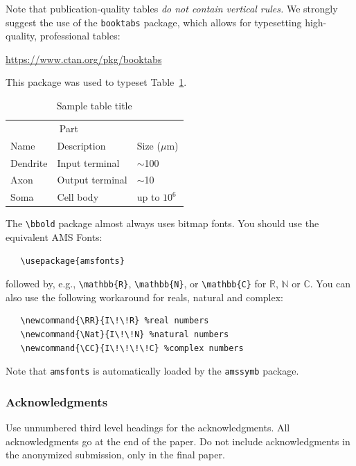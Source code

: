\documentclass{article}
\begin{document}
Note that publication-quality tables \emph{do not contain vertical
  rules.} We strongly suggest the use of the \verb+booktabs+ package,
which allows for typesetting high-quality, professional tables:
\begin{center}
  \url{https://www.ctan.org/pkg/booktabs}
\end{center}
This package was used to typeset Table~\ref{sample-table}.

\begin{table}
  \caption{Sample table title}
  \label{sample-table}
  \centering
  \begin{tabular}{lll}
    \toprule
    \multicolumn{2}{c}{Part}                   \\
    \cmidrule(r){1-2}
    Name     & Description     & Size ($\mu$m) \\
    \midrule
    Dendrite & Input terminal  & $\sim$100     \\
    Axon     & Output terminal & $\sim$10      \\
    Soma     & Cell body       & up to $10^6$  \\
    \bottomrule
  \end{tabular}
\end{table}

The \verb+\bbold+ package almost always uses bitmap fonts.  You
  should use the equivalent AMS Fonts:
\begin{verbatim}
   \usepackage{amsfonts}
\end{verbatim}
followed by, e.g., \verb+\mathbb{R}+, \verb+\mathbb{N}+, or
\verb+\mathbb{C}+ for $\mathbb{R}$, $\mathbb{N}$ or $\mathbb{C}$.  You
can also use the following workaround for reals, natural and complex:
\begin{verbatim}
   \newcommand{\RR}{I\!\!R} %real numbers
   \newcommand{\Nat}{I\!\!N} %natural numbers
   \newcommand{\CC}{I\!\!\!\!C} %complex numbers
\end{verbatim}
Note that \verb+amsfonts+ is automatically loaded by the
\verb+amssymb+ package.

\subsubsection*{Acknowledgments}

Use unnumbered third level headings for the acknowledgments. All
acknowledgments go at the end of the paper. Do not include
acknowledgments in the anonymized submission, only in the final paper.




\end{document}
